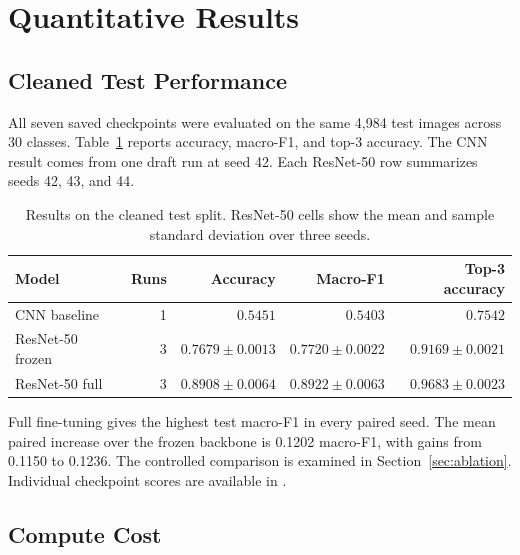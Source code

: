 \section{Quantitative Results}
\label{sec:a2-quantitative-results}

\subsection{Cleaned Test Performance}

All seven saved checkpoints were evaluated on the same 4,984 test images across 30 classes. Table~\ref{tab:test} reports accuracy, macro-F1, and top-3 accuracy. The CNN result comes from one draft run at seed 42. Each ResNet-50 row summarizes seeds 42, 43, and 44.

\begin{table}[H]
  \centering
  \caption{Results on the cleaned test split. ResNet-50 cells show the mean and sample standard deviation over three seeds.}
  \label{tab:test}
  \small
  \begin{tabular}{lrrrr}
    \toprule
    Model & Runs & Accuracy & Macro-F1 & Top-3 accuracy \\
    \midrule
    CNN baseline & 1 & $0.5451$ & $0.5403$ & $0.7542$ \\
    ResNet-50 frozen & 3 & $0.7679 \pm 0.0013$ & $0.7720 \pm 0.0022$ & $0.9169 \pm 0.0021$ \\
    ResNet-50 full & 3 & $0.8908 \pm 0.0064$ & $0.8922 \pm 0.0063$ & $0.9683 \pm 0.0023$ \\
    \bottomrule
  \end{tabular}
\end{table}

Full fine-tuning gives the highest test macro-F1 in every paired seed. The mean paired increase over the frozen backbone is 0.1202 macro-F1, with gains from 0.1150 to 0.1236. The controlled comparison is examined in Section~\ref{sec:ablation}. Individual checkpoint scores are available in .

\subsection{Compute Cost}

